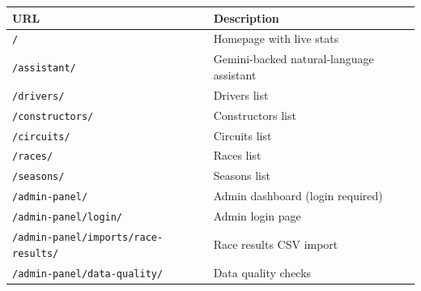 \documentclass[12pt,a4paper]{article}
\begin{document}
\begin{center}
\begin{tabular}{@{}ll@{}}
\toprule
\textbf{URL}                    & \textbf{Description} \\
\midrule
\texttt{/}                      & Homepage with live stats \\
\texttt{/assistant/}            & Gemini-backed natural-language assistant \\
\texttt{/drivers/}              & Drivers list \\
\texttt{/constructors/}         & Constructors list \\
\texttt{/circuits/}             & Circuits list \\
\texttt{/races/}                & Races list \\
\texttt{/seasons/}              & Seasons list \\
\texttt{/admin-panel/}          & Admin dashboard (login required) \\
\texttt{/admin-panel/login/}    & Admin login page \\
\texttt{/admin-panel/imports/race-results/} & Race results CSV import \\
\texttt{/admin-panel/data-quality/} & Data quality checks \\
\bottomrule
\end{tabular}
\end{center}
\end{document}

